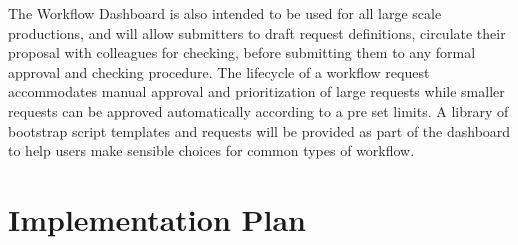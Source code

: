 \documentclass[../main-v1.tex]{subfiles}
\begin{document}
The Workflow Dashboard is also intended to be used for all large scale productions, and will allow submitters to draft request definitions, circulate their proposal with colleagues for checking, before submitting them to any formal approval and checking procedure. The lifecycle of a workflow request accommodates manual approval and prioritization of large requests while smaller requests can be approved automatically according to a pre set limits. A library of bootstrap script templates and requests will be provided as part of the dashboard to help users make sensible choices for common types of workflow.

\section{Implementation Plan }
\end{document}
